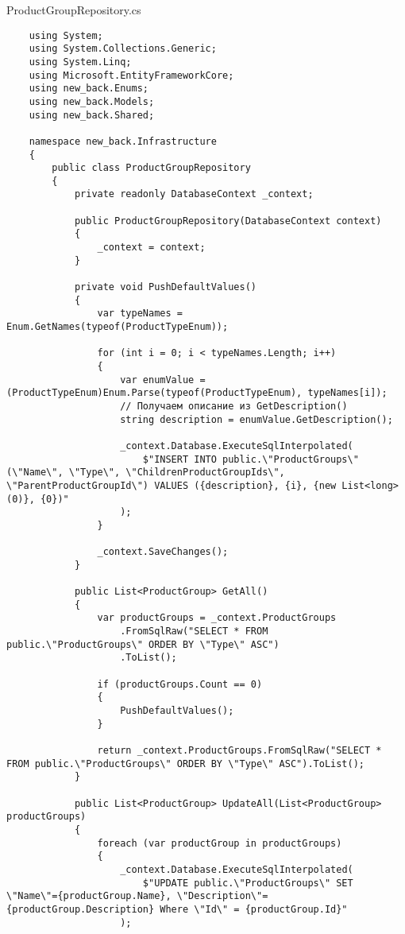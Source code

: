 ProductGroupRepository.cs
\lstset{style=sharpc}
\begin{lstlisting}
    using System;
    using System.Collections.Generic;
    using System.Linq;
    using Microsoft.EntityFrameworkCore;
    using new_back.Enums;
    using new_back.Models;
    using new_back.Shared;
    
    namespace new_back.Infrastructure
    {
        public class ProductGroupRepository
        {
            private readonly DatabaseContext _context;
            
            public ProductGroupRepository(DatabaseContext context)
            {
                _context = context;
            }
    
            private void PushDefaultValues()
            {
                var typeNames = Enum.GetNames(typeof(ProductTypeEnum));
    
                for (int i = 0; i < typeNames.Length; i++)
                {
                    var enumValue = (ProductTypeEnum)Enum.Parse(typeof(ProductTypeEnum), typeNames[i]);
                    // Получаем описание из GetDescription()
                    string description = enumValue.GetDescription();
    
                    _context.Database.ExecuteSqlInterpolated(
                        $"INSERT INTO public.\"ProductGroups\"(\"Name\", \"Type\", \"ChildrenProductGroupIds\", \"ParentProductGroupId\") VALUES ({description}, {i}, {new List<long>(0)}, {0})"
                    );
                }
                
                _context.SaveChanges();
            }
            
            public List<ProductGroup> GetAll()
            {
                var productGroups = _context.ProductGroups
                    .FromSqlRaw("SELECT * FROM public.\"ProductGroups\" ORDER BY \"Type\" ASC")
                    .ToList();
    
                if (productGroups.Count == 0)
                {
                    PushDefaultValues();
                }
                
                return _context.ProductGroups.FromSqlRaw("SELECT * FROM public.\"ProductGroups\" ORDER BY \"Type\" ASC").ToList();
            }
            
            public List<ProductGroup> UpdateAll(List<ProductGroup> productGroups)
            {
                foreach (var productGroup in productGroups)
                {
                    _context.Database.ExecuteSqlInterpolated(
                        $"UPDATE public.\"ProductGroups\" SET \"Name\"={productGroup.Name}, \"Description\"={productGroup.Description} Where \"Id\" = {productGroup.Id}"
                    );
                    

\end{lstlisting}
